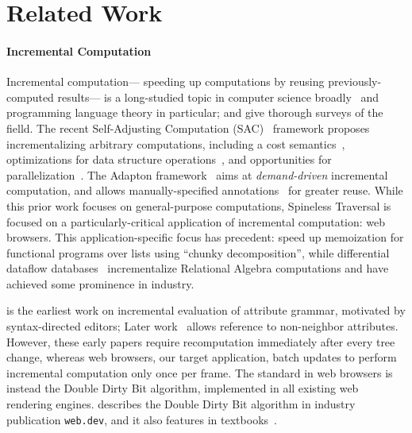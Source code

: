 \section{Related Work}

\paragraph{Incremental Computation}
Incremental computation---%
  speeding up computations by reusing previously-computed results---%
  is a long-studied topic in computer science broadly~\cite{memo}
  and programming language theory in particular;
  \citet{IC-Survey} and \citet{IC-bib}
  give thorough surveys of the fielld.
The recent Self-Adjusting Computation (SAC)~\cite{SAC} framework
  proposes incrementalizing arbitrary computations,
  including a cost semantics~\cite{SACCost},
  optimizations for data structure operations~\cite{SACTrace},
  and opportunities for parallelization~\cite{PSAC}.
The Adapton framework~\cite{Adapton}
  aims at \emph{demand-driven} incremental computation,
  and allows manually-specified annotations~\citet{AdaptonName}
  for greater reuse.
While this prior work focuses on general-purpose computations,
  Spineless Traversal is focused on a particularly-critical application
  of incremental computation: web browsers.
This application-specific focus has precedent:
  \citet{ICC} speed up memoization for functional programs over lists
  using ``chunky decomposition'',
  while differential dataflow databases~\cite{DDF}
  incrementalize Relational Algebra computations
  and have achieved some prominence in industry.

\citet{TR1} is the earliest work
  on incremental evaluation of attribute grammar,
  motivated by syntax-directed editors;
Later work~\cite{TR2} allows reference to non-neighbor attributes.
However, these early papers require recomputation
  immediately after every tree change,
  whereas web browsers, our target application,
  batch updates to perform incremental computation
  only once per frame.
The standard in web browsers is instead
  the Double Dirty Bit algorithm,
  implemented in all existing web rendering engines.
\citet{tali-garseil} describes the Double Dirty Bit algorithm
  in industry publication \texttt{web.dev},
  and it also features in textbooks~\cite{wbe}.
  
